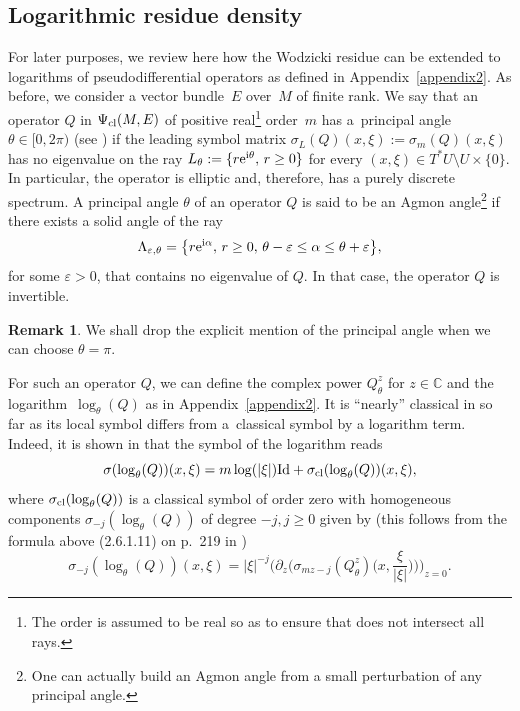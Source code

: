 \documentclass[pdftex]{sigma}
\numberwithin{equation}{section}
\theoremstyle{definition}
\newtheorem{rk}[thm]{Remark}
\newcommand{\C}{\mathbb C}
\begin{document}
\subsection{Logarithmic residue density} \label{sec:logoperator}
For later purposes, we review here how the Wodzicki residue can be extended to logarithms of pseudodifferential operators as defined in Appendix~\ref{appendix2}.
As before, we consider a vector bundle~$E$ over~$M$ of finite rank. We say that an operator $Q$ in $\Psi_{\rm cl}(M, E)$ of positive real\footnote{The order is assumed to be real so as to ensure that does not intersect all rays. } order~$m$ has a~principal angle $\theta\in [0,2\pi)$ (see \cite[Section~1.5.7.1]{Sc}) if the leading symbol matrix $\sigma_L(Q) (x, \xi):=\sigma_m(Q)(x,\xi)$ has no eigenvalue on the ray $L_\theta:= \{ r {\rm e}^{{\rm i}\theta} ,\, r\geq 0\}$ for every $(x, \xi)\in T^*U\setminus U\times \{0\}$.
	 In particular, the operator is elliptic and, therefore, has a purely discrete spectrum. A principal angle $\theta$ of an operator $Q$ is said to be an Agmon angle\footnote{One can actually build an Agmon angle from a small perturbation of any principal angle.} if there exists a solid angle of the ray
\[
\Lambda_{\varepsilon,\theta}=\big\{r{\rm e}^{{\rm i}\alpha},\, r\geq 0, \,\theta-\varepsilon\leq \alpha\leq \theta+\varepsilon\big\},
\]
	 for some $\varepsilon>0$, that contains no eigenvalue of $Q$.
	 In that case, the operator $Q$ is invertible.

\begin{rk} We shall drop the explicit mention of the principal angle when we can choose $\theta=\pi$.\end{rk}
For such an operator $Q$, we can define the complex power $Q_\theta^z$ for $z\in \C$ and the logarithm~$\log_\theta(Q)$ as in Appendix~\ref{appendix2}. It is ``nearly'' classical in so far as its local symbol differs from a~classical symbol by a logarithm term. Indeed, it is shown in \cite[formula~(2.6.1.11)]{Sc} that the symbol of the logarithm reads
\begin{equation}
\label{eq:sigmmalog}
\sigma(\log _\theta (Q))(x,\xi)=m \log (|\xi|){\rm Id} +\sigma_{\rm cl}(\log _\theta (Q))(x,\xi),
\end{equation}
where $\sigma_{\rm cl}(\log _\theta(Q))$ is a classical symbol of order zero with homogeneous components \linebreak $\sigma_{-j}(\log _\theta(Q))$ of degree $-j, j\geq 0$ given by (this follows from the formula above (2.6.1.11) on p.~219 in \cite{Sc})
\begin{equation*}%
\sigma_{-j}(\log _\theta (Q))(x,\xi)=|\xi|^{-j}\biggl(\partial_z\biggl(\sigma_{mz-j}(Q^z_\theta)\biggl(x,\frac{\xi}{|\xi|}\biggr)\biggr)\biggr)_{z=0}.
\end{equation*}
\end{document}
